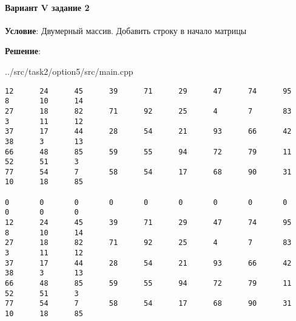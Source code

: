 \paragraph{Вариант V задание 2} \hspace{0pt}

\textbf{Условие}:
Двумерный массив.
Добавить строку в начало матрицы

\textbf{Решение}:


{../src/task2/option5/src/main.cpp}

\begin{lstlisting}[language=Out,]
12      24      45      39      71      29      47      74      95      8       10      14
27      18      82      71      92      25      4       7       83      3       11      12
37      17      44      28      54      21      93      66      42      38      3       13
66      48      85      59      55      94      72      79      11      52      51      3
77      54      7       58      54      17      68      90      31      10      18      85

0       0       0       0       0       0       0       0       0       0       0       0
12      24      45      39      71      29      47      74      95      8       10      14
27      18      82      71      92      25      4       7       83      3       11      12
37      17      44      28      54      21      93      66      42      38      3       13
66      48      85      59      55      94      72      79      11      52      51      3
77      54      7       58      54      17      68      90      31      10      18      85
\end{lstlisting}